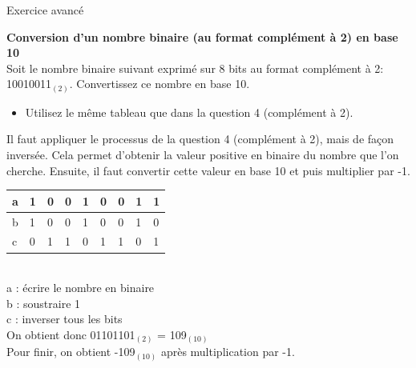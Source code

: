 Exercice avancé 
\begin{Exercice}[5 minutes] \textbf{Conversion d'un nombre binaire (au format complément à 2) en base 10 \optionnel}\\
    
    Soit le nombre binaire suivant exprimé sur 8 bits au format complément à 2: 10010011$_{(2)}$. Convertissez ce nombre en base 10. \\
	
    \begin{conseil}
    
    \begin{itemize}
    	\item Utilisez le même tableau que dans la question 4 (complément à 2).
    \end{itemize}
    
    \end{conseil}
    
    \begin{solution}
       Il faut appliquer le processus de la question 4 (complément à 2), mais de façon inversée. Cela permet d'obtenir la valeur positive en binaire du nombre que l'on cherche. Ensuite, il faut convertir cette valeur en base 10 et puis multiplier par -1. \\
       
       \begin{tabular}{| p{1cm} | p{1cm} | p{1cm} | p{1cm} | p{1cm} | p{1cm} | p{1cm} | p{1cm} | p{1cm} |} 
            \hline
            a & 1 & 0 & 0 & 1 & 0 & 0 & 1 & 1 \\ [0.5ex] 
            \hline
            b & 1 & 0 & 0 & 1 & 0 & 0 & 1 & 0 \\ [0.5ex]
            \hline
            c & 0 & 1 & 1 & 0 & 1 & 1 & 0 & 1 \\ [0.5ex]
            \hline
        \end{tabular} \\
        
        a : écrire le nombre en binaire \\
        
        b : soustraire 1 \\
        
        c : inverser tous les bits \\
        
        On obtient donc 01101101$_{(2)}$ = 109$_{(10)}$ \\
        
        Pour finir, on obtient -109$_{(10)}$ après multiplication par -1.
       
    \end{solution}
\end{Exercice}

